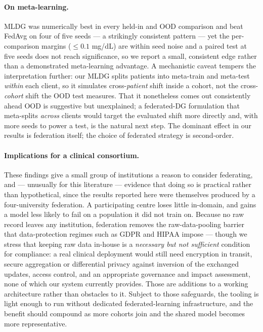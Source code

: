 \documentclass[10pt,letterpaper]{article}
\begin{document}
\paragraph{On meta-learning.} MLDG was numerically best in every held-in and OOD
comparison and beat FedAvg on four of five seeds --- a strikingly consistent
pattern --- yet the per-comparison margins ($\le 0.1$ mg/dL) are within seed
noise and a paired test at five seeds does not reach significance, so we report a
small, consistent edge rather than a demonstrated meta-learning advantage. A
mechanistic caveat tempers the interpretation further: our MLDG splits patients
into meta-train and meta-test \emph{within} each client, so it simulates
cross-\emph{patient} shift inside a cohort, not the cross-\emph{cohort} shift the
OOD test measures. That it nonetheless comes out consistently ahead OOD is
suggestive but unexplained; a federated-DG formulation that meta-splits
\emph{across} clients would target the evaluated shift more directly and, with
more seeds to power a test, is the natural next step. The dominant effect in our
results is federation itself; the choice of federated strategy is second-order.

\paragraph{Implications for a clinical consortium.} These findings give a small
group of institutions a reason to consider federating, and --- unusually for this
literature --- evidence that doing so is practical rather than hypothetical, since
the results reported here were themselves produced by a four-university
federation. A participating centre loses little in-domain, and gains a model less
likely to fail on a population it did not train on. Because no raw record leaves
any institution, federation removes the raw-data-pooling barrier that
data-protection regimes such as GDPR and HIPAA impose --- though we stress that
keeping raw data in-house is a \emph{necessary but not sufficient} condition for
compliance: a real clinical deployment would still need encryption in transit,
secure aggregation or differential privacy against inversion of the exchanged
updates, access control, and an appropriate governance and impact assessment, none
of which our system currently provides. Those are additions to a working
architecture rather than obstacles to it. Subject to those safeguards, the tooling
is light enough to run without dedicated federated-learning infrastructure, and
the benefit should compound as more cohorts join and the shared model becomes
more representative.
\end{document}
